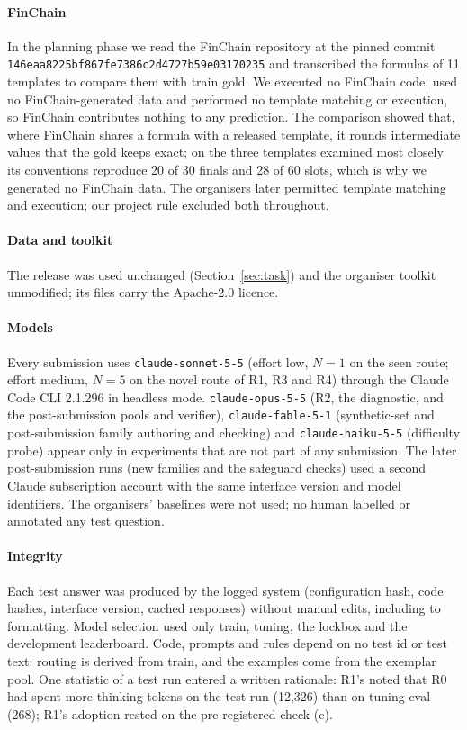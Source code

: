 \documentclass[conference]{IEEEtran}
\newcommand{\id}[1]{\texttt{#1}}
\begin{document}
\paragraph*{FinChain}
In the planning phase we read the FinChain repository at the pinned commit \id{146eaa8225bf867fe7386c2d4727b59e03170235} and transcribed the formulas of 11 templates to compare them with train gold. We executed no FinChain code, used no FinChain-generated data and performed no template matching or execution, so FinChain contributes nothing to any prediction. The comparison showed that, where FinChain shares a formula with a released template, it rounds intermediate values that the gold keeps exact; on the three templates examined most closely its conventions reproduce 20 of 30 finals and 28 of 60 slots, which is why we generated no FinChain data. The organisers later permitted template matching and execution; our project rule excluded both throughout.

\paragraph*{Data and toolkit}
The release was used unchanged (Section~\ref{sec:task}) and the organiser toolkit unmodified; its files carry the Apache-2.0 licence.

\paragraph*{Models}
Every submission uses \id{claude-sonnet-5-5} (effort low, $N=1$ on the seen route; effort medium, $N=5$ on the novel route of R1, R3 and R4) through the Claude Code CLI 2.1.296 in headless mode. \id{claude-opus-5-5} (R2, the diagnostic, and the post-submission pools and verifier), \id{claude-fable-5-1} (synthetic-set and post-submission family authoring and checking) and \id{claude-haiku-5-5} (difficulty probe) appear only in experiments that are not part of any submission. The later post-submission runs (new families and the safeguard checks) used a second Claude subscription account with the same interface version and model identifiers. The organisers' baselines were not used; no human labelled or annotated any test question.

\paragraph*{Integrity}
Each test answer was produced by the logged system (configuration hash, code hashes, interface version, cached responses) without manual edits, including to formatting. Model selection used only train, tuning, the lockbox and the development leaderboard. Code, prompts and rules depend on no test id or test text: routing is derived from train, and the examples come from the exemplar pool. One statistic of a test run entered a written rationale: R1's noted that R0 had spent more thinking tokens on the test run (12,326) than on tuning-eval (268); R1's adoption rested on the pre-registered check (c).
\end{document}
